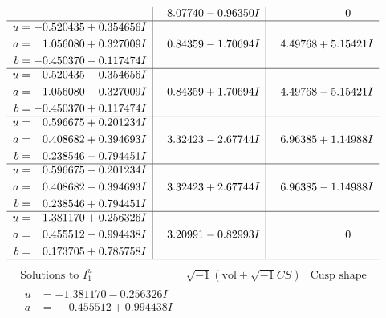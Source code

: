\documentclass[1p]{elsarticle_modified}
\theoremstyle{definition}
\newcommand{\I}{\sqrt{-1}}
\begin{document}
$$\begin{array}{c|c|c}
 & \phantom{-}8.07740 - 0.96350 I & \phantom{-0.000000 } 0 \\ \hline\begin{aligned}
u &= -0.520435 + 0.354656 I \\
a &= \phantom{-}1.056080 + 0.327009 I \\
b &= -0.450370 - 0.117474 I\end{aligned}
 & \phantom{-}0.84359 - 1.70694 I & \phantom{-}4.49768 + 5.15421 I \\ \hline\begin{aligned}
u &= -0.520435 - 0.354656 I \\
a &= \phantom{-}1.056080 - 0.327009 I \\
b &= -0.450370 + 0.117474 I\end{aligned}
 & \phantom{-}0.84359 + 1.70694 I & \phantom{-}4.49768 - 5.15421 I \\ \hline\begin{aligned}
u &= \phantom{-}0.596675 + 0.201234 I \\
a &= \phantom{-}0.408682 + 0.394693 I \\
b &= \phantom{-}0.238546 - 0.794451 I\end{aligned}
 & \phantom{-}3.32423 - 2.67744 I & \phantom{-}6.96385 + 1.14988 I \\ \hline\begin{aligned}
u &= \phantom{-}0.596675 - 0.201234 I \\
a &= \phantom{-}0.408682 - 0.394693 I \\
b &= \phantom{-}0.238546 + 0.794451 I\end{aligned}
 & \phantom{-}3.32423 + 2.67744 I & \phantom{-}6.96385 - 1.14988 I \\ \hline\begin{aligned}
u &= -1.381170 + 0.256326 I \\
a &= \phantom{-}0.455512 - 0.994438 I \\
b &= \phantom{-}0.173705 + 0.785758 I\end{aligned}
 & \phantom{-}3.20991 - 0.82993 I & \phantom{-0.000000 } 0\\
 \hline 
 \end{array}$$\newpage$$\begin{array}{c|c|c}  
\text{Solutions to }I^u_{1}& \I (\text{vol} + \sqrt{-1}CS) & \text{Cusp shape}\\
 \hline 
\begin{aligned}
u &= -1.381170 - 0.256326 I \\
a &= \phantom{-}0.455512 + 0.994438 I \\

\end{aligned}
\end{array}$$
\end{document}

